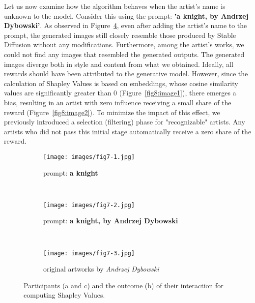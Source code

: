 \documentclass[12pt, letterpaper]{article}
\begin{document}
Let us now examine how the algorithm behaves when the artist's name is unknown to the model. Consider this using the prompt: \textbf{'a knight, by Andrzej Dybowski'}. As observed in Figure~\ref{fig7:stacked_images}, even after adding the artist's name to the prompt, the generated images still closely resemble those produced by Stable Diffusion without any modifications. Furthermore, among the artist's works, we could not find any images that resembled the generated outputs. The generated images diverge both in style and content from what we obtained. Ideally, all rewards should have been attributed to the generative model. However, since the calculation of Shapley Values is based on embeddings, whose cosine similarity values are significantly greater than 0 (Figure~\ref{fig8:image1}), there emerges a bias, resulting in an artist with zero influence receiving a small share of the reward (Figure~\ref{fig8:image2}). To minimize the impact of this effect, we previously introduced a selection (filtering) phase for "recognizable" artists. Any artists who did not pass this initial stage automatically receive a zero share of the reward.

\begin{figure}[h]
    \centering
    
    \begin{subfigure}{\textwidth}
        \centering
        \texttt{[image: images/fig7-1.jpg]}
        \caption{prompt: \textbf{a knight}}
        \label{fig7:sub1}
    \end{subfigure}
    \\
    
    \begin{subfigure}{\textwidth}
        \centering
        \texttt{[image: images/fig7-2.jpg]}
        \caption{prompt: \textbf{a knight,  by Andrzej Dybowski}}
        \label{fig7:sub2}
    \end{subfigure}
    \\
   
    \begin{subfigure}{\textwidth}
        \centering
        \texttt{[image: images/fig7-3.jpg]}
        \caption{original artworks by \textit{Andrzej Dybowski}}
        \label{fig7:sub3}
    \end{subfigure}    

    \caption{Participants (a and c) and the outcome (b) of their interaction for computing Shapley Values.}
    \label{fig7:stacked_images}
\end{figure}
\end{document}
